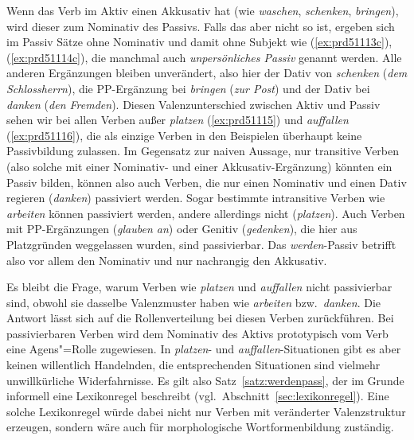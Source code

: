 Wenn das Verb im Aktiv einen Akkusativ hat (wie \textit{waschen}, \textit{schenken}, \textit{bringen}), wird dieser zum Nominativ des Passivs.
Falls das aber nicht so ist, ergeben sich im Passiv Sätze ohne Nominativ und damit ohne Subjekt wie (\ref{ex:prd51113c}), (\ref{ex:prd51114c}), die manchmal auch \textit{unpersönliches Passiv} genannt werden.
Alle anderen Ergänzungen bleiben unverändert, also hier der Dativ von \textit{schenken} (\textit{dem Schlossherrn}), die PP-Ergänzung bei \textit{bringen} (\textit{zur Post}) und der Dativ bei \textit{danken} (\textit{den Fremden}).
Diesen Valenzunterschied zwischen Aktiv und Passiv sehen wir bei allen Verben außer \textit{platzen} (\ref{ex:prd51115}) und \textit{auffallen} (\ref{ex:prd51116}), die als einzige Verben in den Beispielen überhaupt keine Passivbildung zulassen.
Im Gegensatz zur naiven Aussage, nur transitive Verben (also solche mit einer Nominativ- und einer Akkusativ-Ergänzung) könnten ein Passiv bilden, können also \zB auch Verben, die nur einen Nominativ und einen Dativ regieren (\textit{danken}) passiviert werden.
Sogar bestimmte intransitive Verben wie \textit{arbeiten} können passiviert werden, andere allerdings nicht (\textit{platzen}).
Auch Verben mit PP-Ergänzungen (\textit{glauben an}) oder Genitiv (\textit{gedenken}), die hier aus Platzgründen weggelassen wurden, sind passivierbar.
Das \textit{werden}-Passiv betrifft also vor allem den Nominativ und nur nachrangig den Akkusativ.

Es bleibt die Frage, warum Verben wie \textit{platzen} und \textit{auffallen} nicht passivierbar sind, obwohl sie dasselbe Valenzmuster haben wie \textit{arbeiten} bzw.\ \textit{danken}.
Die Antwort lässt sich auf die Rollenverteilung bei diesen Verben zurückführen.
Bei passivierbaren Verben wird dem Nominativ des Aktivs prototypisch vom Verb eine Agens"=Rolle zugewiesen.
In \textit{platzen}- und \textit{auffallen}-Situationen gibt es aber keinen willentlich Handelnden, die entsprechenden Situationen sind vielmehr unwillkürliche Widerfahrnisse.
Es gilt also Satz~\ref{satz:werdenpass}, der im Grunde informell eine Lexikonregel beschreibt (vgl.\ Abschnitt~\ref{sec:lexikonregel}).
Eine solche Lexikonregel würde dabei nicht nur Verben mit veränderter Valenzstruktur erzeugen, sondern wäre auch für morphologische Wortformenbildung zuständig.



